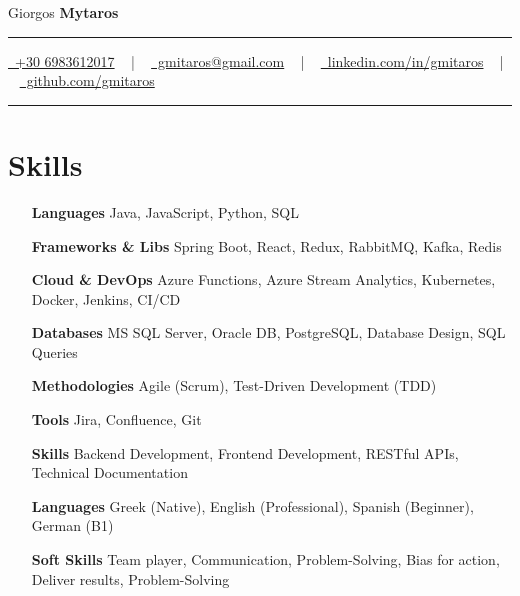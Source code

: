\documentclass[letterpaper,10pt]{article}
\newcommand{\documentTitle}[2]{
  \begin{center}
    {\Huge\color{accentTitle} #1}
    \vspace{10pt}
    {\color{accentLine} \hrule}
    \vspace{2pt}
    \footnotesize{#2}
    \vspace{2pt}
    {\color{accentLine} \hrule}
  \end{center}
}
\newcommand{\tinysection}[1]{
  \phantomsection
  \addcontentsline{toc}{section}{#1}
  {\large{\bfseries\color{accentText}#1} {\color{accentLine} |}}
}
\begin{document}

  \documentTitle{Giorgos \textbf{Mytaros}}{
    \href{tel:+306983612017}{
      \raisebox{-0.05\height} \faPhone\ +30 6983612017} ~ | ~
    \href{mailto:gmitaros@gmail.com}{
      \raisebox{-0.15\height} \faEnvelope\ gmitaros@gmail.com} ~ | ~
    \href{https://www.linkedin.com/in/gmitaros/}{
      \raisebox{-0.15\height} \faLinkedin\ linkedin.com/in/gmitaros} ~ | ~
    \href{https://github.com/gmitaros}{
      \raisebox{-0.15\height} \faGithub\ github.com/gmitaros}
  }




  \section{Skills}

    \begin{itemize}[itemsep=-1.5px, parsep=0.5pt, leftmargin=90pt]
     \item[\textbf{Languages}] Java, JavaScript, Python, SQL
      \item[\textbf{Frameworks \& Libs}] Spring Boot, React, Redux, RabbitMQ, Kafka, Redis
      \item[\textbf{Cloud \& DevOps}] Azure Functions, Azure Stream Analytics, Kubernetes, Docker, Jenkins, CI/CD
      \item[\textbf{Databases}] MS SQL Server, Oracle DB, PostgreSQL, Database Design, SQL Queries
      \item[\textbf{Methodologies}] Agile (Scrum), Test-Driven Development (TDD)
      \item[\textbf{Tools}] Jira, Confluence, Git
      \item[\textbf{Skills}] Backend Development, Frontend Development, RESTful APIs, Technical Documentation
      \item[\textbf{Languages}] Greek (Native), English (Professional), Spanish (Beginner), German (B1)
      \item[\textbf{Soft Skills}] Team player, Communication, Problem-Solving, Bias for action, Deliver results, Problem-Solving
    \end{itemize}
\end{document}
